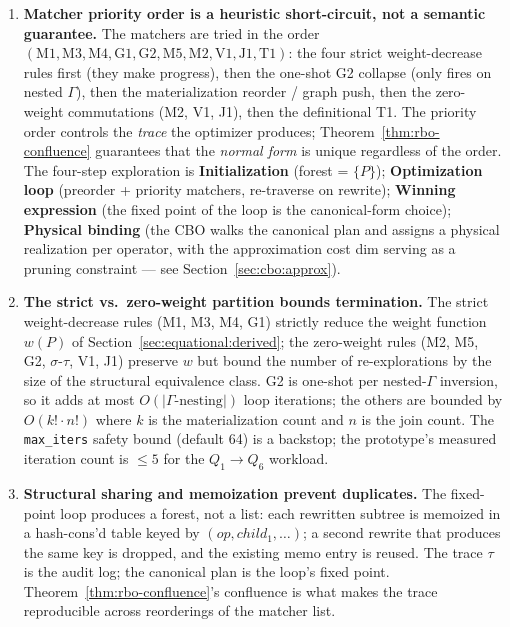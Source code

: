 \documentclass[sigconf,nonacm,review]{acmart}
\theoremstyle{plain}
\theoremstyle{definition}
\theoremstyle{remark}
\begin{document}
\begin{enumerate}[leftmargin=*, itemsep=0pt]
  \item \textbf{Matcher priority order is a heuristic
  short-circuit, not a semantic guarantee.} The matchers
  are tried in the order
  $(\mathrm{M1}, \mathrm{M3}, \mathrm{M4}, \mathrm{G1},
  \mathrm{G2}, \mathrm{M5}, \mathrm{M2}, \mathrm{V1},
  \mathrm{J1}, \mathrm{T1})$: the four strict weight-decrease
  rules first (they make progress), then the one-shot G2
  collapse (only fires on nested $\Gamma$), then the
  materialization reorder / graph push, then the
  zero-weight commutations (M2, V1, J1), then the
  definitional T1. The priority order controls the
  \emph{trace} the optimizer produces; Theorem~\ref{thm:rbo-confluence}
  guarantees that the \emph{normal form} is unique
  regardless of the order. The four-step exploration is
  \textbf{Initialization} (forest = $\{P\}$);
  \textbf{Optimization loop} (preorder + priority
  matchers, re-traverse on rewrite);
  \textbf{Winning expression} (the fixed point of the
  loop is the canonical-form choice);
  \textbf{Physical binding} (the CBO walks the
  canonical plan and assigns a physical realization
  per operator, with the approximation cost dim
  serving as a pruning constraint --- see
  Section~\ref{sec:cbo:approx}).
  \item \textbf{The strict vs.\ zero-weight partition
  bounds termination.} The strict weight-decrease
  rules (M1, M3, M4, G1) strictly reduce the
  weight function $w(P)$ of
  Section~\ref{sec:equational:derived}; the
  zero-weight rules (M2, M5, G2, $\sigma$-$\tau$, V1,
  J1) preserve $w$ but bound the number of
  re-explorations by the size of the structural
  equivalence class. G2 is one-shot per nested-$\Gamma$
  inversion, so it adds at most $O(|\Gamma\text{-nesting}|)$
  loop iterations; the others are bounded by
  $O(k! \cdot n!)$ where $k$ is the materialization
  count and $n$ is the join count. The
  \texttt{max\_iters} safety bound (default 64) is a
  backstop; the prototype's measured iteration
  count is $\le 5$ for the $Q_1 \to Q_6$ workload.
  \item \textbf{Structural sharing and memoization
  prevent duplicates.} The fixed-point loop produces
  a forest, not a list: each rewritten subtree is
  memoized in a hash-cons'd table keyed by
  $(\mathit{op}, \mathit{child}_1, \ldots)$; a second
  rewrite that produces the same key is dropped, and
  the existing memo entry is reused. The trace
  $\tau$ is the audit log; the canonical plan is
  the loop's fixed point. Theorem~\ref{thm:rbo-confluence}'s
  confluence is what makes the trace reproducible
  across reorderings of the matcher list.
\end{enumerate}
\end{document}
